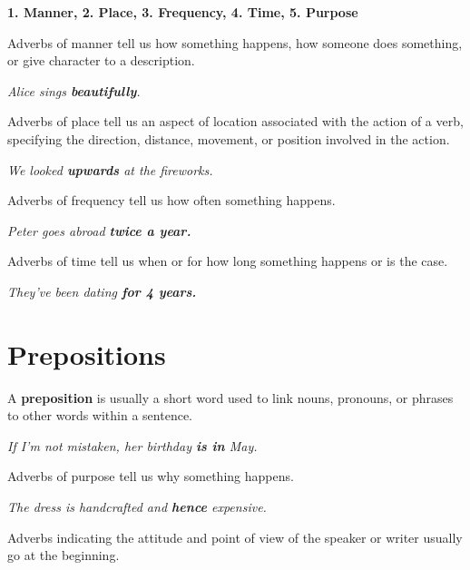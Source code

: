 \documentclass[hidelinks,10pt,a4paper]{article}
\begin{document}
\begin{center}
	\textbf{1. Manner, 2. Place, 3. Frequency, 4. Time, 5. Purpose}
\end{center}

Adverbs of manner tell us how something happens, how someone does something, or give character to a description.

\begin{center}
	\textit{Alice sings \textbf{beautifully}.}
\end{center}

Adverbs of place tell us an aspect of location associated with the action of a verb, specifying the direction, distance, movement, or position involved in the action.

\begin{center}
	\textit{We looked \textbf{upwards} at the fireworks.}
\end{center}

Adverbs of frequency tell us how often something happens.

\begin{center}
	\textit{Peter goes abroad \textbf{twice a year.} }
\end{center}

Adverbs of time tell us when or for how long something happens or is the case.

\begin{center}
	\textit{They've been dating \textbf{for 4 years.} }
\end{center}

\section{Prepositions}
A \textbf{preposition} is usually a short word used to link nouns, pronouns, or phrases to other words within a sentence.

\begin{center}
	\textit{If I'm not mistaken, her birthday \textbf{is in} May. }
\end{center}

Adverbs of purpose tell us why something happens.

\begin{center}
	\textit{The dress is handcrafted and \textbf{hence} expensive. }
\end{center}

Adverbs indicating the attitude and point of view of the speaker or writer usually go at the beginning.
\end{document}

